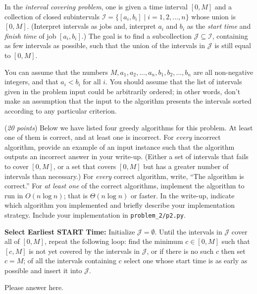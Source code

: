 \documentclass{hw_template}
\begin{document}
\begin{problem}
In the {\em interval covering problem},
one is given a time interval $[0,M]$
and a collection of closed subintervals
$\mathcal{I} = \{[a_i,b_i] \mid i=1,2,\ldots,n\}$
whose union is $[0,M]$. (Interpret intervals as jobs
and, interpret $a_i$ and $b_i$ as the {\em start time}
and {\em finish time} of job $[a_i,b_i]$.)
The goal is to find a subcollection
$\mathcal{J} \subseteq \mathcal{I}$, containing
as few intervals as possible, such that
the union of the intervals in $\mathcal{J}$
is still equal to $[0,M]$.

You can assume that the
numbers $M,a_1,a_2,\ldots,a_n,b_1,b_2,\ldots,b_n$
are all non-negative integers, and that
$a_i < b_i$ for all $i$. You should assume
that the list of intervals given in the
problem input could be arbitrarily ordered;
in other words, don't make an assumption that
the input to the algorithm presents the intervals
sorted according to any particular criterion.

(\textit{20 points}) Below we have listed four greedy algorithms for
this problem. At least one of them is correct,
and at least one is incorrect. For {\em every} incorrect
algorithm, provide an example of an input instance
such that the algorithm outputs an incorrect answer
in your write-up.
(Either a set of intervals that fails to cover $[0,M]$,
or a set that covers $[0,M]$ but has a greater number
of intervals than necessary.) For {\em every} correct
algorithm, write, ``The algorithm is correct.''
For {\em at least one} of the correct algorithms,
implement the algorithm to run in $O(n \log n)$; that is 
$\Theta(n \log n)$ or faster.
In the write-up, indicate which algorithm you implemented
and briefly describe your implementation strategy. Include your implementation in \texttt{problem\_2/p2.py}.

  \begin{subproblem}
    \textbf{Select Earliest START Time:}
  Initialize $\mathcal{J}=\emptyset$.
  Until the intervals in $\mathcal{J}$ cover all of $[0,M]$,
  repeat the following loop: find the minimum $c \in [0,M]$
  such that $[c,M]$ is not yet covered by the intervals in $\mathcal{J}$,
  or if there is no such $c$ then set $c=M$; of all the intervals
  containing $c$ select one whose start time is as early as 
  possible and insert it into $\mathcal{J}$.
  \end{subproblem}

\begin{solution}
Please answer here.
\end{solution}


\end{problem}
\end{document}

